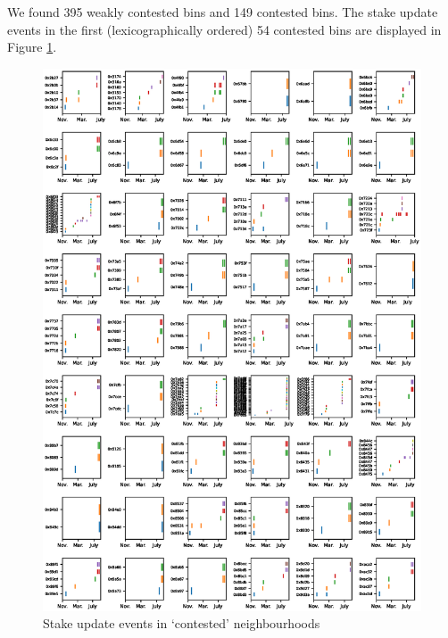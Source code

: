 We found 395 weakly contested bins and 149 contested bins. 
%
The stake update events in the first (lexicographically ordered) 54 contested bins are displayed in Figure \ref{event-plot}.
%
\begin{figure}[p]
  \centering
  \includegraphics[width=\textwidth]{common/contested.eps}
  \caption{Stake update events in `contested' neighbourhoods}
  \label{event-plot}
\end{figure}

